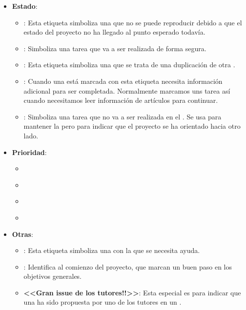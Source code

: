 \begin{itemize}
  \item \textbf{Estado}:
        \begin{itemize}
          \item \textbf{}: Esta etiqueta simboliza una  que no se puede reproducir debido a que el estado del proyecto no ha llegado al punto esperado todavía.
          \item \textbf{}: Simboliza una tarea que va a ser realizada de forma segura.
          \item \textbf{}: Esta etiqueta simboliza una  que se trata de una duplicación de otra .
          \item \textbf{}: Cuando una  está marcada con esta etiqueta necesita información adicional para ser completada. Normalmente marcamos uns tarea así cuando necesitamos leer información de artículos para continuar.
          \item \textbf{}: Simboliza una tarea que no va a ser realizada en el . Se usa para mantener la  pero para indicar que el proyecto se ha orientado hacia otro lado.
        \end{itemize}

  \item \textbf{Prioridad}:
        \begin{itemize}
          \item \textbf{}
          \item \textbf{}
          \item \textbf{}
          \item \textbf{}
        \end{itemize}

  \item \textbf{Otras}:
        \begin{itemize}
          \item \textbf{}: Esta etiqueta simboliza una  con la que se necesita ayuda.
          \item \textbf{}: Identifica  al comienzo del proyecto, que marcan un buen paso en los objetivos generales.
          \item \textbf{<<Gran issue de los tutores!!>>}: Esta  especial es para indicar que una  ha sido propuesta por uno de los tutores en un .
        \end{itemize}
\end{itemize}

